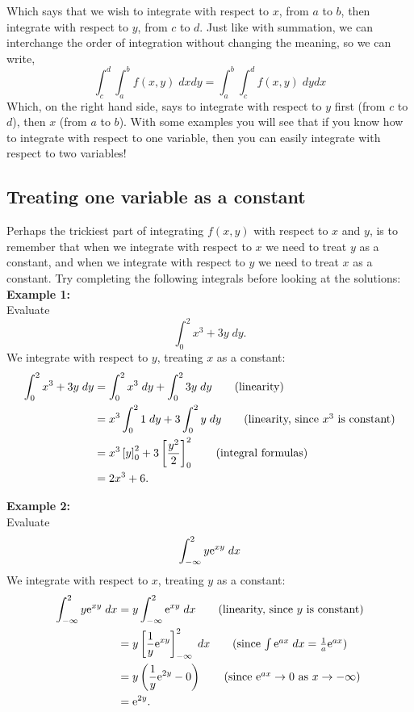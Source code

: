   	\bigskip
	
	\hfil{}
	\bigskip
	\bigskip

\noindent Which says that we wish to integrate with respect to $x$, from $a$ to $b$, then integrate with respect to $y$, from $c$ to $d$. Just like with summation, we can interchange the order of integration without changing the meaning, so we can write,
\[
\int_c^d \int_a^b f(x,y) \; dx dy = \int_a^b \int_c^d f(x,y) \; dy dx
\]
Which, on the right hand side, says to integrate with respect to $y$ first (from $c$ to $d$), then $x$ (from $a$ to $b$). With some examples you will see that if you know how to integrate with respect to one variable, then you can easily integrate with respect to two variables!

\subsection{Treating one variable as a constant}
Perhaps the trickiest part of integrating $f(x,y)$ with respect to $x$ and $y$, is to remember that when we integrate with respect to $x$ we need to treat $y$ as a constant, and when we integrate with respect to $y$ we need to treat $x$ as a constant. Try completing the following integrals before looking at the solutions: \\

\noindent \textbf{Example 1:} \\
Evaluate
\[
\int_0^2 x^3 + 3y \; dy.
\]
\solution
We integrate with respect to $y$, treating $x$ as a constant:
\begin{align*}
\int_0^2 x^3 + 3y \; dy & = \int_0^2 x^3 \; dy + \int_0^2 3y \; dy  \tag{linearity} \\
	& = x^3\int_0^2 1 \; dy + 3\int_0^2 y \; dy \tag{linearity, since $x^3$ is constant} \\
	& = x^3\left[y\right]^2_0 + 3\left[\frac{y^2}{2}\right]_0^2 \tag{integral formulas} \\
	& = 2x^3 + 6.
\end{align*}

\noindent \textbf{Example 2:} \\
Evaluate
\[
\int_{-\infty}^2 y\mathrm{e}^{xy} \; dx
\]
\solution
We integrate with respect to $x$, treating $y$ as a constant:
\begin{align*}
\int_{-\infty}^2 y\e^{xy} \; dx & = y\int_{-\infty}^2 \e^{xy} \; dx \tag{linearity, since $y$ is constant} \\
	& = y\squac{\frac{1}{y}\e^{xy}}_{-\infty}^2 \; dx \tag{since $\int \e^{ax} \; dx = \frac{1}{a}\e^{ax}$} \\
	& = y\brac{\frac{1}{y}\e^{2y} - 0} \tag{since $\e^{ax} \rightarrow 0$ as $x \rightarrow -\infty$} \\
	& = \e^{2y}.
\end{align*}

